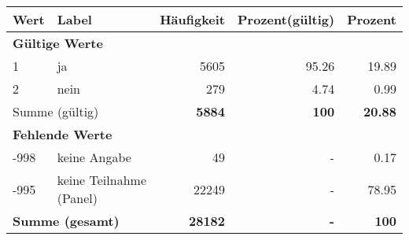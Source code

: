      \begin{longtable}{lXrrr}
     \toprule
     \textbf{Wert} & \textbf{Label} & \textbf{Häufigkeit} & \textbf{Prozent(gültig)} & \textbf{Prozent} \\
     \endhead
     \midrule
     \multicolumn{5}{l}{\textbf{Gültige Werte}}\\

     1 &
     \multicolumn{1}{X}{ ja   } &


       \num{5605} &
       \num[round-mode=places,round-precision=2]{95.26} &
         \num[round-mode=places,round-precision=2]{19.89} \\

     2 &
     \multicolumn{1}{X}{ nein   } &


       \num{279} &
       \num[round-mode=places,round-precision=2]{4.74} &
         \num[round-mode=places,round-precision=2]{0.99} \\
     \midrule
     \multicolumn{2}{l}{Summe (gültig)} &
       \textbf{\num{5884}} &
     \textbf{100} &
       \textbf{\num[round-mode=places,round-precision=2]{20.88}} \\
     \multicolumn{5}{l}{\textbf{Fehlende Werte}}\\
       -998 &
       keine Angabe &
         \num{49} &
        - &
         \num[round-mode=places,round-precision=2]{0.17} \\
       -995 &
       keine Teilnahme (Panel) &
         \num{22249} &
        - &
         \num[round-mode=places,round-precision=2]{78.95} \\
     \midrule
     \multicolumn{2}{l}{\textbf{Summe (gesamt)}} &
          \textbf{\num{28182}} &
        \textbf{-} &
        \textbf{100} \\
     \bottomrule
     \end{longtable}
     
